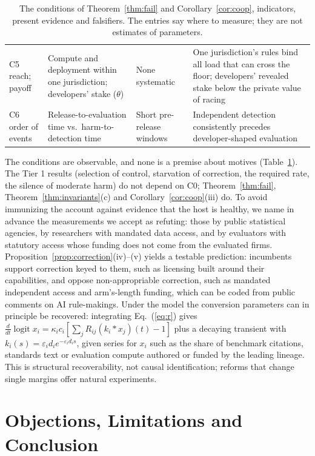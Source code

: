 \documentclass[letterpaper]{article} %
\theoremstyle{definition}
\begin{document}
\begin{table}[t]
\begin{tabular}{@{}>{\raggedright\arraybackslash}p{2.4cm}>{\raggedright\arraybackslash}p{3.9cm}>{\raggedright\arraybackslash}p{6.4cm}>{\raggedright\arraybackslash}p{4.4cm}@{}}
C5 reach; payoff & Compute and deployment within one jurisdiction; developers' stake ($\theta$) & None systematic & One jurisdiction's rules bind all load that can cross the floor; developers' revealed stake below the private value of racing \\
C6 order of events & Release-to-evaluation time vs.\ harm-to-detection time & Short pre-release windows \citep{metr2025o3} & Independent detection consistently precedes developer-shaped evaluation \\
\bottomrule
\end{tabular}
\caption{The conditions of Theorem~\ref{thm:fail} and Corollary~\ref{cor:coop}, indicators, present evidence and falsifiers. The entries say where to measure; they are not estimates of parameters.}
\label{tab:evidence}
\end{table}



The conditions are observable, and none is a premise about motives (Table~\ref{tab:evidence}). The Tier 1 results (selection of control, starvation of correction, the required rate, the silence of moderate harm) do not depend on C0; Theorem~\ref{thm:fail}, Theorem~\ref{thm:invariants}(c) and Corollary~\ref{cor:coop}(iii) do. To avoid immunizing the account against evidence that the host is healthy, we name in advance the measurements we accept as refuting: those by public statistical agencies, by researchers with mandated data access, and by evaluators with statutory access whose funding does not come from the evaluated firms. Proposition~\ref{prop:correction}(iv)--(v) yields a testable prediction: incumbents support correction keyed to them, such as licensing built around their capabilities, and oppose non-appropriable correction, such as mandated independent access and arm's-length funding, which can be coded from public comments on AI rule-makings. Under the model the conversion parameters can in principle be recovered: integrating Eq.~(\ref{eq:r}) gives $\tfrac{d}{dt}\operatorname{logit}x_i=\kappa_ic_i[\sum_jR_{ij}(k_i*x_j)(t)-1]$ plus a decaying transient with $k_i(s)=\varepsilon_id_ie^{-\varepsilon_id_is}$, given series for $x_i$ such as the share of benchmark citations, standards text or evaluation compute authored or funded by the leading lineage. This is structural recoverability, not causal identification; reforms that change single margins offer natural experiments.

\section{Objections, Limitations and Conclusion}\label{sec:conclusion}
\end{document}
